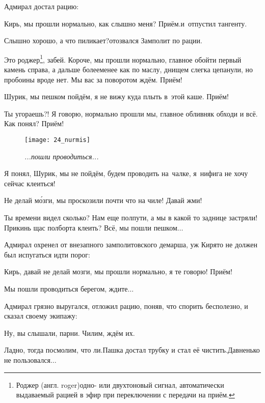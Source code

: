 Адмирал достал рацию:

\diagdash Кирь, мы прошли нормально, как слышно меня? Приём.\mdash и~отпустил тангенту.

\diagdash Слышно хорошо, а что пиликает?\mdash отозвался Замполит по рации.

\renewcommand*{\thefootnote}{\fnsymbol{footnote}}
\setcounter{footnote}{0}
\diagdash Это роджер\footnote{Роджер (англ. roger)\mdash одно- или двухтоновый сигнал, автоматически выдаваемый рацией в эфир при переключении с передачи на приём.}, забей. Короче, мы прошли нормально, главное обойти первый камень справа, а дальше более\sdash менее как по маслу, днищем слегка цепанули, но пробоины вроде нет. Мы вас за поворотом ждём. Приём!

\diagdash Шурик, мы пешком пойдём, я не вижу куда плыть в~этой каше. Приём!

\diagdash Ты угораешь?! Я говорю, нормально прошли мы, главное обливняк обходи и всё. Как понял? Приём!

{
\setlength{\belowcaptionskip}{-20pt}
\begin{figure}[h]
	\centering
	\texttt{[image: 24\_nurmis]}
	\caption{\small\textit{...пошли проводиться...}}
\end{figure}
%
\diagdash Я понял, Шурик, мы не пойдём, будем проводить на~чалке, я~нифига не хочу сейчас клеиться! %
}

\diagdash Не делай м\'{о}зги, мы проскозили почти что на чиле! Давай жми!

\diagdash Ты времени видел сколько? Нам еще полпути, а мы в какой то заднице застряли! Прикинь щас полборта клеить? Всё, мы пошли пешком$\ldots$

Адмирал охренел от внезапного замполитовского демарша, уж Киря\sdash то не должен был испугаться идти порог:

\diagdash Кирь, давай не делай мозги, мы прошли нормально, я те говорю! Приём!

\diagdash Мы пошли проводиться берегом, ждите$\ldots$

Адмирал грязно выругался, отложил рацию, поняв, что спорить бесполезно, и сказал своему экипажу:

\diagdash Ну, вы слышали, парни. Чилим, ждём их.

\diagdash Ладно, тогда посмолим, что ли.\mdash Пашка достал трубку и стал её чистить.\mdash Давненько не пользовался$\ldots$


